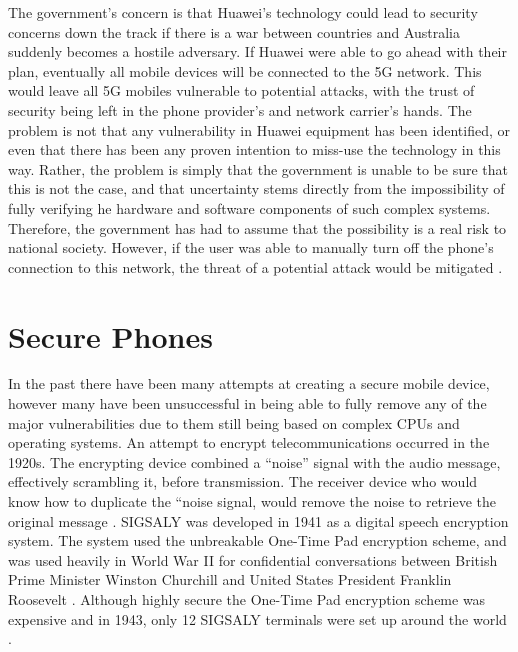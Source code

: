 The government’s concern is that Huawei’s technology could lead to security concerns down the track if there is a war between countries and Australia suddenly becomes a hostile adversary.
If Huawei were able to go ahead with their plan, eventually all mobile devices will be connected to the 5G network.
This would leave all 5G mobiles vulnerable to potential attacks, with the trust of security being left in the phone provider’s and network carrier’s hands.
The problem is not that any vulnerability in Huawei equipment has been identified, or even that there has been any proven intention to miss-use the technology in this way.
Rather, the problem is simply that the government is unable to be sure that this is not the case, and that uncertainty stems directly from the impossibility of fully verifying he hardware and software components of such complex systems.
Therefore, the government has had to assume that the possibility is a real risk to national society.
However, if the user was able to manually turn off the phone’s connection to this network, the threat of a potential attack would be mitigated \cite{RN14}.


\section{Secure Phones}

	In the past there have been many attempts at creating a secure mobile device, however many have been unsuccessful in being able to fully remove any of the major vulnerabilities due to them still being based on complex CPUs and operating systems. 
	An attempt to encrypt telecommunications occurred in the 1920s.
        The encrypting device combined a “noise” signal with the audio message, effectively scrambling it, before transmission.
        The receiver device who would know how to duplicate the “noise signal, would remove the noise to retrieve the original message \cite{RN30}.
	SIGSALY was developed in 1941 as a digital speech encryption system.
        The system used the unbreakable One-Time Pad encryption scheme, and was used heavily in World War II for confidential conversations between British Prime Minister Winston Churchill and United States President Franklin Roosevelt \cite{RN21}.
        Although highly secure the One-Time Pad encryption scheme was expensive and in 1943, only 12 SIGSALY terminals were set up around the world \cite{RN21}.

